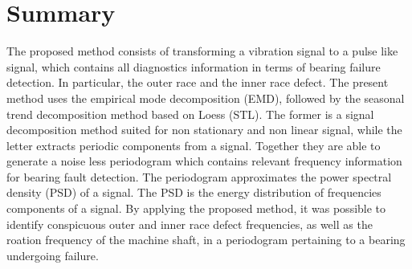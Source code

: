 \documentclass[../Main/thesis.tex]{subfiles}
\begin{document}
\section{Summary}
\label{sec:limitation}
The proposed method consists of transforming a vibration signal to a pulse like signal, which contains all diagnostics information in terms of bearing failure detection. In particular, the outer race and the inner race defect. The present method uses the empirical mode decomposition (EMD), followed by the seasonal trend decomposition method based on Loess (STL). The former is a signal decomposition method suited for non stationary and non linear signal, while the letter extracts periodic components from a signal.
\justify
Together they are able to generate a noise less periodogram which contains relevant frequency information for bearing fault detection. The periodogram approximates the power spectral density (PSD) of a signal. The PSD is the energy distribution of frequencies components of a signal.
By applying the proposed method, it was possible to identify conspicuous outer and inner race defect frequencies, as well as the roation frequency of the machine shaft, in a periodogram pertaining to a bearing undergoing failure.








\blankpage
\end{document}
